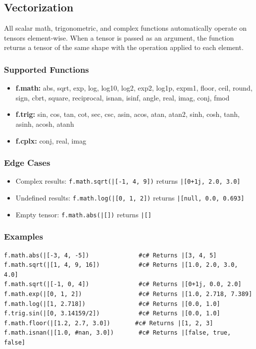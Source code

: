 \subsection{Vectorization}
All scalar math, trigonometric, and complex functions automatically operate on tensors element-wise. When a tensor is passed as an argument, the function returns a tensor of the same shape with the operation applied to each element.

\subsubsection{Supported Functions}
\begin{itemize}
\item \textbf{f.math:} abs, sqrt, exp, log, log10, log2, exp2, log1p, expm1, floor, ceil, round, sign, cbrt, square, reciprocal, isnan, isinf, angle, real, imag, conj, fmod
\item \textbf{f.trig:} sin, cos, tan, cot, sec, csc, asin, acos, atan, atan2, sinh, cosh, tanh, asinh, acosh, atanh
\item \textbf{f.cplx:} conj, real, imag
\end{itemize}

\subsubsection{Edge Cases}
\begin{itemize}
\item Complex results: \texttt{f.math.sqrt(|[-1, 4, 9])} returns \texttt{|[0+1j, 2.0, 3.0]}
\item Undefined results: \texttt{f.math.log(|[0, 1, 2])} returns \texttt{|[null, 0.0, 0.693]}
\item Empty tensor: \texttt{f.math.abs(|[])} returns \texttt{|[]}
\end{itemize}

\subsubsection{Examples}
\begin{verbatim}
f.math.abs(|[-3, 4, -5])              #c# Returns |[3, 4, 5]
f.math.sqrt(|[1, 4, 9, 16])           #c# Returns |[1.0, 2.0, 3.0, 4.0]
f.math.sqrt(|[-1, 0, 4])              #c# Returns |[0+1j, 0.0, 2.0]
f.math.exp(|[0, 1, 2])                #c# Returns |[1.0, 2.718, 7.389]
f.math.log(|[1, 2.718])               #c# Returns |[0.0, 1.0]
f.trig.sin(|[0, 3.14159/2])           #c# Returns |[0.0, 1.0]
f.math.floor(|[1.2, 2.7, 3.0])       #c# Returns |[1, 2, 3]
f.math.isnan(|[1.0, #nan, 3.0])       #c# Returns |[false, true, false]
\end{verbatim}


